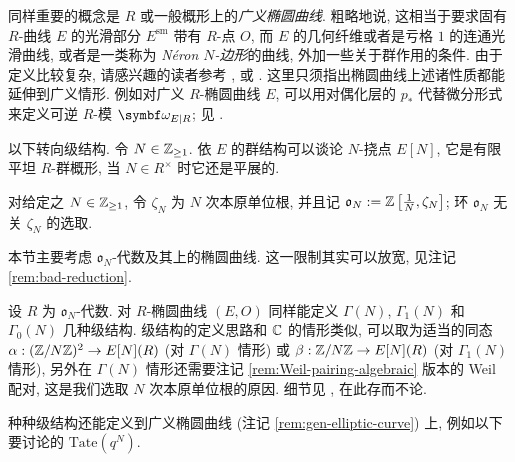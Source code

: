 \begin{remark}\label{rem:gen-elliptic-curve}
	同样重要的概念是 $R$ 或一般概形上的\emph{广义椭圆曲线}. 粗略地说, 这相当于要求固有 $R$-曲线 $E$ 的光滑部分 $E^{\mathrm{sm}}$ 带有 $R$-点 $O$, 而 $E$ 的几何纤维或者是亏格 $1$ 的连通光滑曲线, 或者是一类称为 \emph{Néron $N$-边形}的曲线, 外加一些关于群作用的条件. 由于定义比较复杂, 请感兴趣的读者参考 \cite[II. 1.2]{DR73}, \cite[Definition 2.1.4]{Co07} 或 \cite[定义 7.3]{LZ}. 这里只须指出椭圆曲线上述诸性质都能延伸到广义情形. 例如对广义 $R$-椭圆曲线 $E$, 可以用对偶化层的 $p_*$ 代替微分形式来定义可逆 $R$-模 $\bomega_{E|R}$; 见 \cite[II. Proposition 1.6]{DR73}.
\end{remark}

以下转向级结构. 令 $N \in \mathbb{Z}_{\geq 1}$. 依 $E$ 的群结构可以谈论 $N$-挠点 $E[N]$, 它是有限平坦 $R$-群概形, 当 $N \in R^\times$ 时它还是平展的.

\begin{definition}
	对给定之 $N \in \mathbb{Z}_{\geq 1}$, 令 $\zeta_N$ 为 $N$ 次本原单位根, 并且记 $\mathfrak{o}_N := \mathbb{Z}\left[\frac{1}{N}, \zeta_N \right]$; 环 $\mathfrak{o}_N$ 无关 $\zeta_N$ 的选取.
\end{definition}

本节主要考虑 $\mathfrak{o}_N$-代数及其上的椭圆曲线. 这一限制其实可以放宽, 见注记 \ref{rem:bad-reduction}.

设 $R$ 为 $\mathfrak{o}_N$-代数. 对 $R$-椭圆曲线 $(E, O)$ 同样能定义 $\Gamma(N)$, $\Gamma_1(N)$ 和 $\Gamma_0(N)$ 几种级结构. 级结构的定义思路和 $\mathbb{C}$ 的情形类似, 可以取为适当的同态 $\alpha: (\mathbb{Z}/N\mathbb{Z})^2 \to E[N](R)$ (对 $\Gamma(N)$ 情形) 或 $\beta: \mathbb{Z}/N\mathbb{Z} \to E[N](R)$ (对 $\Gamma_1(N)$ 情形), 另外在 $\Gamma(N)$ 情形还需要注记 \ref{rem:Weil-pairing-algebraic} 版本的 Weil 配对, 这是我们选取 $N$ 次本原单位根的原因. 细节见 \cite{DR73, Ka73}, 在此存而不论.

种种级结构还能定义到广义椭圆曲线 (注记 \ref{rem:gen-elliptic-curve}) 上, 例如以下要讨论的 $\mathrm{Tate}\left( q^N \right)$.

